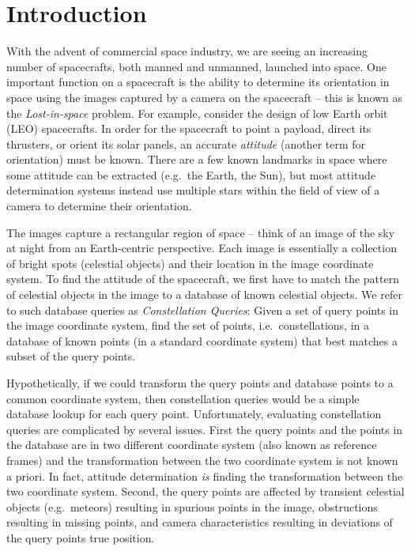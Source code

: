 \section{Introduction}\label{sec:introduction}
With the advent of commercial space industry, we are seeing an increasing number of spacecrafts, both manned and
unmanned, launched into space.
One important function on a spacecraft is the ability to determine its orientation in space using the images captured
by a camera on the spacecraft -- this is known as the \textit{Lost-in-space} problem.
For example, consider the design of low Earth orbit (LEO) spacecrafts.
In order for the spacecraft to point a payload, direct its thrusters, or orient its solar panels, an accurate
\textit{attitude} (another term for orientation) must be known.
There are a few known landmarks in space where some attitude can be extracted (e.g.\ the Earth, the Sun), but most
attitude determination systems instead use multiple stars within the field of view of a camera to determine their
orientation.

The images capture a rectangular region of space -- think of an image of the sky at night from an Earth-centric
perspective.
Each image is essentially a collection of bright spots (celestial objects) and their location in the image coordinate
system.
To find the attitude of the spacecraft, we first have to match the pattern of celestial objects in the image to a
database of known celestial objects.
We refer to such database queries as \textit{Constellation Queries}:
Given a set of query points in the image coordinate system, find the set of points, i.e.\ constellations, in a
database of known points (in a standard coordinate system) that best matches a subset of the query points.

Hypothetically, if we could transform the query points and database points to a common coordinate system, then
constellation queries would be a simple database lookup for each query point.
Unfortunately, evaluating constellation queries are complicated by several issues.
First the query points and the points in the database are in two different coordinate system (also known
as reference frames) and the transformation between the two coordinate system is not known a priori.
In fact, attitude determination \emph{is} finding the transformation between the two coordinate system.
Second, the query points are affected by transient celestial objects (e.g.\ meteors) resulting in spurious
points in the image, obstructions resulting in missing points, and camera characteristics resulting in
deviations of the query points true position.

